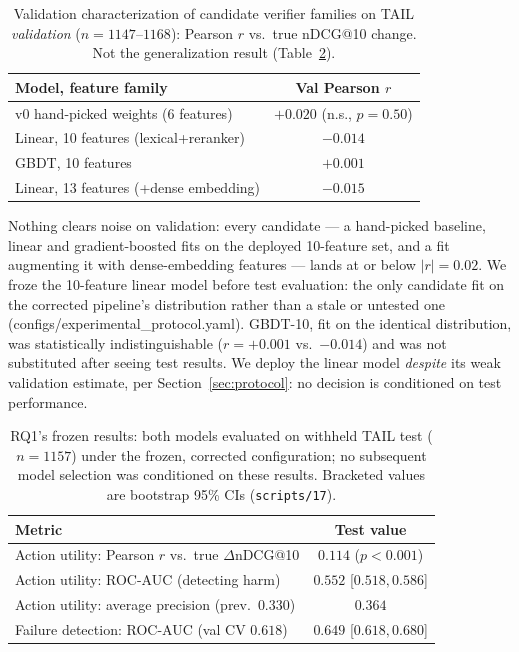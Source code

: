 \documentclass[conference]{IEEEtran}
\begin{document}
\begin{table}[t]
\caption{Validation characterization of candidate verifier families on TAIL \emph{validation} ($n=1147$--$1168$): Pearson $r$ vs.\ true nDCG@10 change. Not the generalization result (Table~\ref{tab:rq1-test}).}
\label{tab:rq1}
\centering
\begin{tabular}{lc}
\toprule
Model, feature family & Val Pearson $r$ \\
\midrule
v0 hand-picked weights (6 features) & $+0.020$ (n.s., $p{=}0.50$) \\
Linear, 10 features (lexical+reranker) & $-0.014$ \\
GBDT, 10 features & $+0.001$ \\
Linear, 13 features (+dense embedding) & $-0.015$ \\
\bottomrule
\end{tabular}
\end{table}

Nothing clears noise on validation: every candidate --- a hand-picked
baseline, linear and gradient-boosted fits on the deployed 10-feature
set, and a fit augmenting it with dense-embedding features --- lands
at or below $|r|=0.02$. We froze the 10-feature linear model before
test evaluation: the only candidate fit on the corrected pipeline's
distribution rather than a stale or untested one
(configs/experimental\_protocol.yaml). GBDT-10, fit on the identical
distribution, was statistically indistinguishable ($r{=}{+}0.001$
vs.\ $-0.014$) and was not substituted after seeing test results. We
deploy the linear model \emph{despite} its weak validation estimate,
per Section~\ref{sec:protocol}: no decision is conditioned on test
performance.

\begin{table}[t]
\caption{RQ1's frozen results: both models evaluated on withheld TAIL test ($n=1157$) under the frozen, corrected configuration; no subsequent model selection was conditioned on these results. Bracketed values are bootstrap 95\% CIs (\texttt{scripts/17}).}
\label{tab:rq1-test}
\centering
\begin{tabular}{lc}
\toprule
Metric & Test value \\
\midrule
Action utility: Pearson $r$ vs.\ true $\Delta$nDCG@10 & $0.114$ ($p<0.001$) \\
Action utility: ROC-AUC (detecting harm) & $0.552$ [$0.518,0.586$] \\
Action utility: average precision (prev.\ $0.330$) & $0.364$ \\
Failure detection: ROC-AUC (val CV $0.618$) & $\mathbf{0.649}$ [$0.618,0.680$] \\
\bottomrule
\end{tabular}
\end{table}
\end{document}
